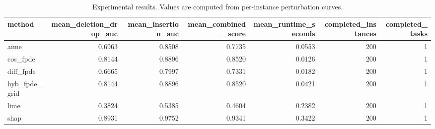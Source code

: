 \begin{table}[t]
\caption{Experimental results. Values are computed from per-instance perturbation curves.}
\label{tab:main_results_computed}
\centering
\begin{tabular}{lrrrrrr}
\toprule
method & mean\_deletion\_drop\_auc & mean\_insertion\_auc & mean\_combined\_score & mean\_runtime\_seconds & completed\_instances & completed\_tasks \\
\midrule
aime & 0.6963 & 0.8508 & 0.7735 & 0.0553 & 200 & 1 \\
cos\_fpde & 0.8144 & 0.8896 & 0.8520 & 0.0126 & 200 & 1 \\
diff\_fpde & 0.6665 & 0.7997 & 0.7331 & 0.0182 & 200 & 1 \\
hyb\_fpde\_grid & 0.8144 & 0.8896 & 0.8520 & 0.0421 & 200 & 1 \\
lime & 0.3824 & 0.5385 & 0.4604 & 0.2382 & 200 & 1 \\
shap & 0.8931 & 0.9752 & 0.9341 & 0.3422 & 200 & 1 \\
\bottomrule
\end{tabular}

\end{table}
